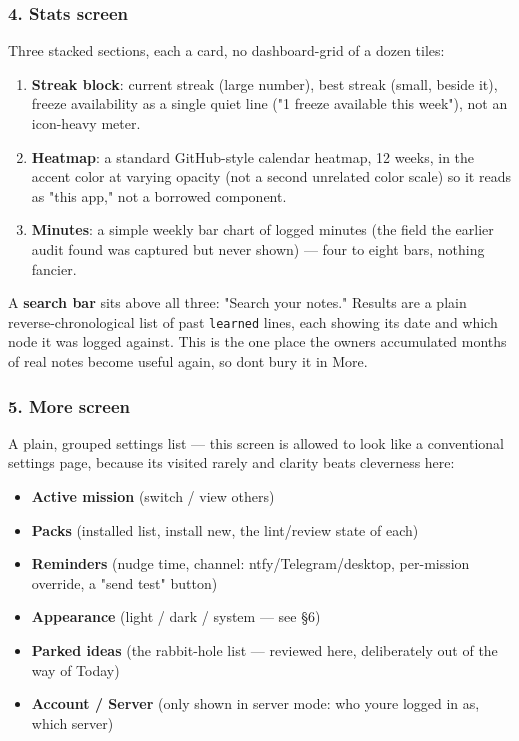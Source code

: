 \hypertarget{ui-ux-spec-4-stats-screen}{%
\subsubsection{4. Stats screen}\label{ui-ux-spec-4-stats-screen}}

Three stacked sections, each a card, no dashboard-grid of a dozen tiles:

\begin{enumerate}
\def\labelenumi{\arabic{enumi}.}
\tightlist
\item
  \textbf{Streak block}: current streak (large number), best streak
  (small, beside it), freeze availability as a single quiet line ("1
  freeze available this week"), not an icon-heavy meter.
\item
  \textbf{Heatmap}: a standard GitHub-style calendar heatmap, 12 weeks,
  in the accent color at varying opacity (not a second unrelated color
  scale) so it reads as "this app," not a borrowed component.
\item
  \textbf{Minutes}: a simple weekly bar chart of logged minutes (the
  field the earlier audit found was captured but never shown) --- four
  to eight bars, nothing fancier.
\end{enumerate}

A \textbf{search bar} sits above all three: "Search your notes." Results
are a plain reverse-chronological list of past \texttt{learned} lines,
each showing its date and which node it was logged against. This is the
one place the owner\textquotesingle s accumulated months of real notes
become useful again, so don\textquotesingle t bury it in More.

\hypertarget{ui-ux-spec-5-more-screen}{%
\subsubsection{5. More screen}\label{ui-ux-spec-5-more-screen}}

A plain, grouped settings list --- this screen is allowed to look like a
conventional settings page, because it\textquotesingle s visited rarely
and clarity beats cleverness here:

\begin{itemize}
\tightlist
\item
  \textbf{Active mission} (switch / view others)
\item
  \textbf{Packs} (installed list, install new, the lint/review state of
  each)
\item
  \textbf{Reminders} (nudge time, channel: ntfy/Telegram/desktop,
  per-mission override, a "send test" button)
\item
  \textbf{Appearance} (light / dark / system --- see §6)
\item
  \textbf{Parked ideas} (the rabbit-hole list --- reviewed here,
  deliberately out of the way of Today)
\item
  \textbf{Account / Server} (only shown in server mode: who
  you\textquotesingle re logged in as, which server)
\end{itemize}

